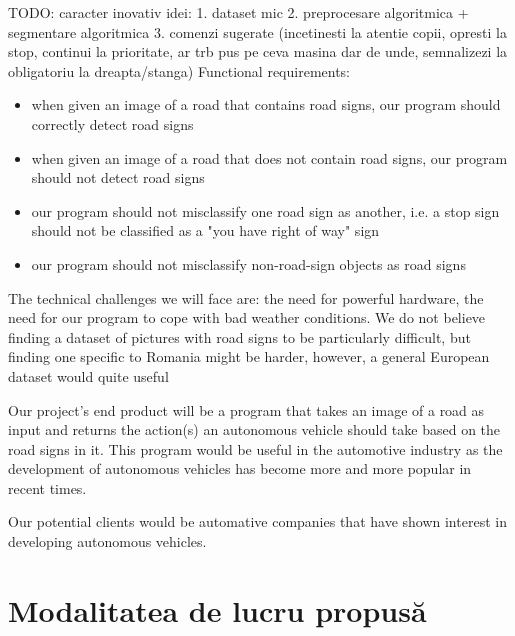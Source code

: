 \documentclass{article}
\begin{document}
TODO: caracter inovativ
idei:
1. dataset mic
2. preprocesare algoritmica + segmentare algoritmica
3. comenzi sugerate (incetinesti la atentie copii, opresti la stop, continui la prioritate, ar trb pus pe ceva masina dar de unde, semnalizezi la obligatoriu la dreapta/stanga)
Functional requirements:
\begin{itemize}
  \item when given an image of a road that contains road signs, our program should correctly detect road signs
  \item when given an image of a road that does not contain road signs, our program should not detect road signs
  \item our program should not misclassify one road sign as another, i.e. a stop sign should not be classified as
  a "you have right of way" sign
  \item our program should not misclassify non-road-sign objects as road signs
\end{itemize}

The technical challenges we will face are: the need for powerful hardware, the need for our program to cope
with bad weather conditions. We do not believe finding a dataset of pictures with road signs to be particularly
difficult, but finding one specific to Romania might be harder, however, a general European dataset would
quite useful


Our project's end product will be a program that takes an image of a road as input and returns the action(s) an
autonomous vehicle should take based on the road signs in it. This program would be useful in the automotive
industry as the development of autonomous vehicles has become more and more popular in recent times.

Our potential clients would be automative companies that have shown interest in developing autonomous vehicles.

\section{Modalitatea de lucru propusă}
\end{document}
